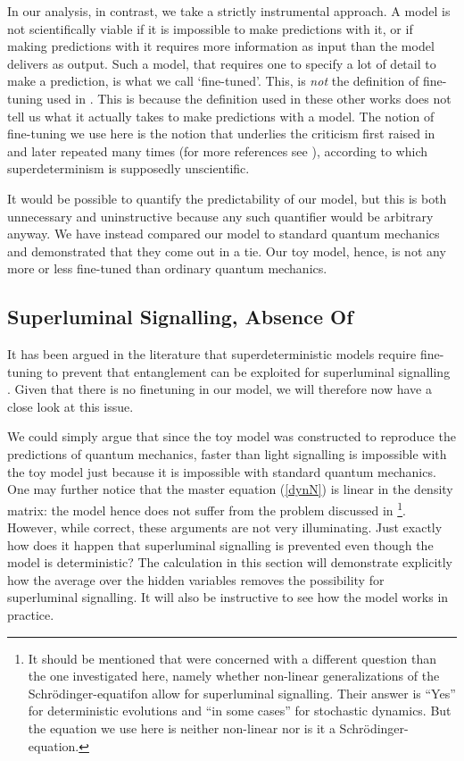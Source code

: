 \documentclass[11pt,twoside,A4]{article}
\begin{document}
In our analysis, in contrast, we take a strictly instrumental approach. A model is not scientifically viable if it is impossible to make predictions with it, or if making predictions with it requires more information as input than the model delivers as output. Such a model, that requires one to specify a lot of detail to make a prediction, is what we call `fine-tuned'. This, is \emph{not} the definition of fine-tuning used in \cite{finetuning,Valentini1,Valentini2}. This is because the definition used in these other works does not tell us what it actually takes to make predictions with a model. The notion of fine-tuning we use here is the notion that underlies the criticism first raised in \cite{SC,Bell77} and later repeated many times (for more references see \cite{Hossenfelder:2019shy,Chen:2020yoa}), according to which superdeterminism is supposedly unscientific.  

It would be possible to quantify the predictability of our model, but this is both unnecessary and uninstructive because any such quantifier would be arbitrary anyway. We have instead compared our model to standard quantum mechanics and demonstrated that they come out in a tie. Our toy model, hence, is not any more or less fine-tuned than ordinary quantum mechanics. 
 


\subsection{Superluminal Signalling, Absence Of}
\label{fine}


It has been argued in the literature that superdeterministic models require fine-tuning to prevent that entanglement can be exploited for superluminal signalling \cite{finetuning,Bendersky}. Given that there is no finetuning in our model, we will therefore now have a close look at this issue.

We could simply argue that since the toy model was constructed to reproduce the predictions of quantum mechanics, 
faster than light signalling is impossible with the toy model just because it is impossible with standard quantum mechanics. 
One may further notice that the master equation (\ref{dynN}) is linear in the density matrix: the model hence does not suffer from the problem discussed in \cite{Gisin:1989sx,Bassi:2015jka} \footnote{It should be mentioned that \cite{Gisin:1989sx,Bassi:2015jka} were concerned with a different question than the one investigated here, namely whether non-linear generalizations of the Schr\"odinger-equatifon allow for superluminal signalling. Their answer is ``Yes'' for deterministic evolutions and ``in some cases'' for stochastic dynamics. But the equation we use here is neither non-linear nor is it a Schr\"odinger-equation. 
}. However, while correct, these arguments are not very illuminating. Just exactly how does it happen that superluminal signalling is prevented even though the model is deterministic? The calculation in this section will demonstrate explicitly how the average over the hidden variables removes the possibility for superluminal signalling. It will also be instructive to see how the model works in practice.
\end{document}
